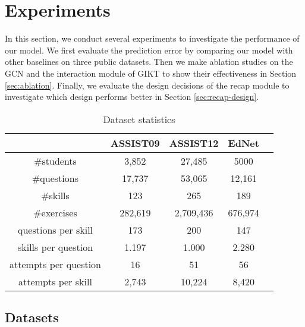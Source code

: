 \documentclass[runningheads]{llncs}
\begin{document}
\section{Experiments}
In this section, we conduct several experiments to investigate the performance of our model. We first evaluate the prediction error by comparing our model with other baselines on three public datasets. Then we make ablation studies on the GCN and the interaction module of GIKT to show their effectiveness in Section \ref{sec:ablation}. Finally, we evaluate the design decisions of the recap module to investigate which design performs better in Section \ref{sec:recap-design}.

\begin{table}
	\centering
	\caption{Dataset statistics}
	\vspace{-5pt}
	\label{tab:stat}
	\begin{tabular}{ccccc}
		\hline
		& ASSIST09 & ASSIST12 & EdNet  \\
		\hline
		\#students & 3,852 & 27,485 & 5000  \\
		\#questions & 17,737 & 53,065 & 12,161  \\
		\#skills & 123 & 265 & 189  \\
		\#exercises & 282,619 & 2,709,436 & 676,974  \\
		questions per skill & 173 & 200 & 147   \\
		skills per question & 1.197 & 1.000 & 2.280  \\
		attempts per question & 16 & 51 & 56  \\
		attempts per skill & 2,743 & 10,224 & 8,420 \\
		\hline
	\end{tabular}
	\label{tab:dataset}
\end{table}


\subsection{Datasets}
\end{document}
